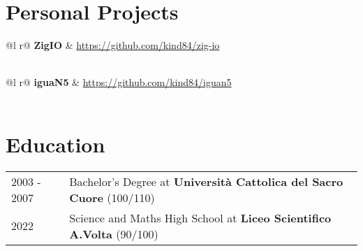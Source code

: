 \documentclass[a4paper,11pt]{article}
\begin{document}
\section{Personal Projects}

\begin{tabularx}{\linewidth}{ @{}l r@{} }
\textbf{ZigIO} & \hfill \href{https://github.com/kind84/zig-io}{https://github.com/kind84/zig-io} \\[3.75pt]
  \\
\end{tabularx}

\begin{tabularx}{\linewidth}{ @{}l r@{} }
\textbf{iguaN5} & \hfill \href{https://github.com/kind84/iguan5}{https://github.com/kind84/iguan5} \\[3.75pt]
  \\
\end{tabularx}

\section{Education}
\begin{tabularx}{\linewidth}{@{}l X@{}}	
2003 - 2007 & Bachelor's Degree at \textbf{Università Cattolica del Sacro Cuore} \hfill (100/110) \\ 

2022 & Science and Maths High School at \textbf{Liceo Scientifico A.Volta} \hfill  (90/100) \\
\end{tabularx}

\end{document}
